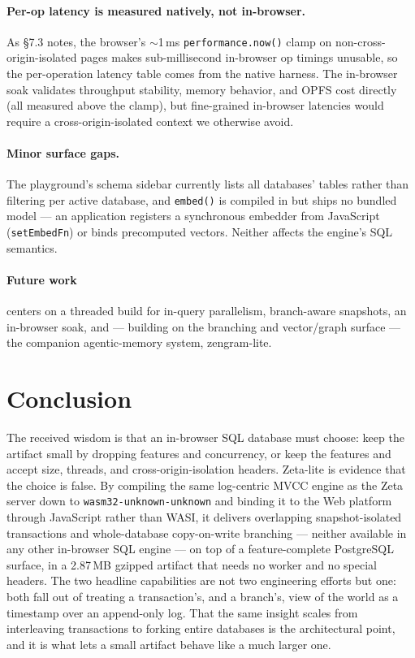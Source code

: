 \documentclass[11pt]{article}
\begin{document}
\paragraph{Per-op latency is measured natively, not in-browser.}
As \S7.3 notes, the browser's $\sim$1\,ms \texttt{performance.now()} clamp on
non-cross-origin-isolated pages makes sub-millisecond in-browser op timings unusable,
so the per-operation latency table comes from the native harness. The in-browser
soak validates throughput stability, memory behavior, and OPFS cost directly (all
measured above the clamp), but fine-grained in-browser latencies would require a
cross-origin-isolated context we otherwise avoid.

\paragraph{Minor surface gaps.}
The playground's schema sidebar currently lists all databases' tables rather than
filtering per active database, and \texttt{embed()} is compiled in but ships no
bundled model --- an application registers a synchronous embedder from JavaScript
(\texttt{setEmbedFn}) or binds precomputed vectors. Neither affects the engine's SQL
semantics.

\paragraph{Future work}
centers on a threaded build for in-query parallelism, branch-aware snapshots, an
in-browser soak, and --- building on the branching and vector/graph surface --- the
companion agentic-memory system, zengram-lite.

\section{Conclusion}

The received wisdom is that an in-browser SQL database must choose: keep the artifact
small by dropping features and concurrency, or keep the features and accept size,
threads, and cross-origin-isolation headers. Zeta-lite is evidence that the choice
is false. By compiling the same log-centric MVCC engine as the Zeta server down to
\texttt{wasm32-unknown-unknown} and binding it to the Web platform through
JavaScript rather than WASI, it delivers overlapping snapshot-isolated transactions
and whole-database copy-on-write branching --- neither available in any other
in-browser SQL engine --- on top of a feature-complete PostgreSQL surface, in a
2.87\,MB gzipped artifact that needs no worker and no special headers. The two
headline capabilities are not two engineering efforts but one: both fall out of
treating a transaction's, and a branch's, view of the world as a timestamp over an
append-only log. That the same insight scales from interleaving transactions to
forking entire databases is the architectural point, and it is what lets a small
artifact behave like a much larger one.
\end{document}
